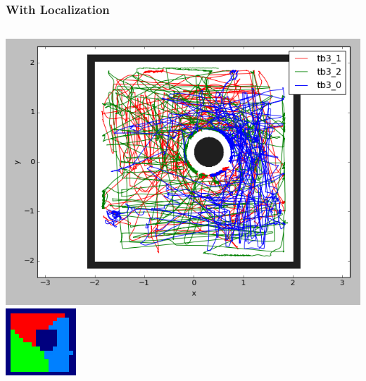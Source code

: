 \documentclass{beamer}
\begin{document}
	\begin{frame}
		\frametitle{With Localization}
		\begin{columns}
			\includegraphics[width=\columnwidth]{dec_with_lo.png}
			\includegraphics[width=\columnwidth]{or5.png}
		\end{columns}
	\end{frame}
\end{document}
